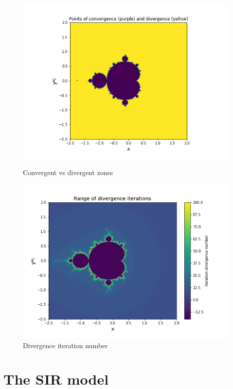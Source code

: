 \documentclass{article}
\begin{document}
\begin{figure}[!htb]
   \begin{minipage}{0.48\textwidth}
     \centering
     \includegraphics[width=1.1\linewidth]{fig21.png}
     \caption{Convergent vs divergent zones}
   \end{minipage}\hfill
   \begin{minipage}{0.48\textwidth}
     \centering
     \includegraphics[width=1.1\linewidth]{fig22.png}
     \caption{Divergence iteration number}
   \end{minipage}
\end{figure}


\newpage
\section{The SIR model}
\end{document}
